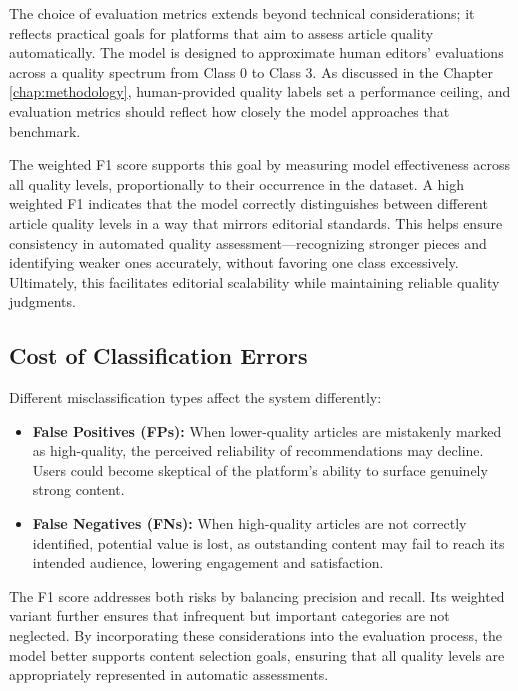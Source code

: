 The choice of evaluation metrics extends beyond technical considerations; it reflects practical goals for platforms that aim to assess article quality automatically. The model is designed to approximate human editors' evaluations across a quality spectrum from \ac{Class 0} to \ac{Class 3}. As discussed in the Chapter \ref{chap:methodology}, human-provided quality labels set a performance ceiling, and evaluation metrics should reflect how closely the model approaches that benchmark.

The weighted F1 score supports this goal by measuring model effectiveness across all quality levels, proportionally to their occurrence in the dataset. A high weighted F1 indicates that the model correctly distinguishes between different article quality levels in a way that mirrors editorial standards. This helps ensure consistency in automated quality assessment—recognizing stronger pieces and identifying weaker ones accurately, without favoring one class excessively. Ultimately, this facilitates editorial scalability while maintaining reliable quality judgments.

\subsection{Cost of Classification Errors}
Different misclassification types affect the system differently:

\begin{itemize}
\item \textbf{False Positives (FPs):} When lower-quality articles are mistakenly marked as high-quality, the perceived reliability of recommendations may decline. Users could become skeptical of the platform's ability to surface genuinely strong content.
\item \textbf{False Negatives (FNs):} When high-quality articles are not correctly identified, potential value is lost, as outstanding content may fail to reach its intended audience, lowering engagement and satisfaction.
\end{itemize}

The F1 score addresses both risks by balancing precision and recall. Its weighted variant further ensures that infrequent but important categories are not neglected. By incorporating these considerations into the evaluation process, the model better supports content selection goals, ensuring that all quality levels are appropriately represented in automatic assessments.
